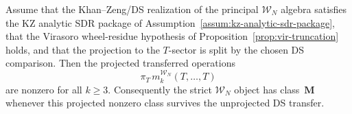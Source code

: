 \begin{theorem}
\label{thm:wn-class-M}
%
%
Assume that the Khan--Zeng/DS realization of the principal
$\mathcal{W}_N$ algebra satisfies the KZ analytic SDR package of
Assumption~\textup{\ref{assum:kz-analytic-sdr-package}}, that the
Virasoro wheel-residue hypothesis of
Proposition~\textup{\ref{prop:vir-truncation}} holds, and that the
projection to the $T$-sector is split by the chosen DS comparison.
Then the projected transferred operations
\[
 \pi_T\,m_k^{\mathcal W_N}(T,\ldots,T)
\]
are nonzero for all $k\ge 3$. Consequently the strict
$\mathcal W_N$ object has class~$\mathbf M$ whenever this projected
nonzero class survives the unprojected DS transfer.
\end{theorem}

